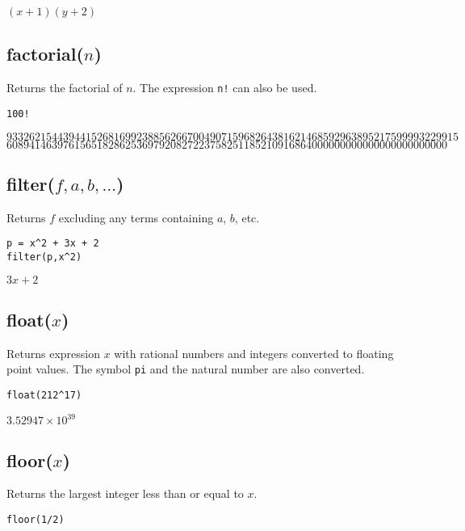 \noindent
$\displaystyle (x+1)(y+2)$

\subsection*{factorial($n$)}

Returns the factorial of $n$.
The expression {\tt n!} can also be used.

{\color{blue}
\begin{verbatim}
100!
\end{verbatim}
}

\noindent
$93326215443944152681699238856266700490715968264381621468592963895217599993229915$\\
$608941463976156518286253697920827223758251185210916864000000000000000000000000$

\subsection*{filter($f,a,b,\ldots$)}

Returns $f$ excluding any terms containing $a$, $b$, etc.

{\color{blue}
\begin{verbatim}
p = x^2 + 3x + 2
filter(p,x^2)
\end{verbatim}
}

\noindent
$3x+2$

\subsection*{float($x$)}

Returns expression $x$ with rational numbers and integers converted to
floating point values.
The symbol {\tt pi} and the natural number are also converted.

{\color{blue}
\begin{verbatim}
float(212^17)
\end{verbatim}
}

\noindent
$\displaystyle 3.52947\times 10^{39}$

\subsection*{floor($x$)}

Returns the largest integer less than or equal to $x$.

\par
{\color{blue}
\begin{verbatim}
floor(1/2)
\end{verbatim}
}

